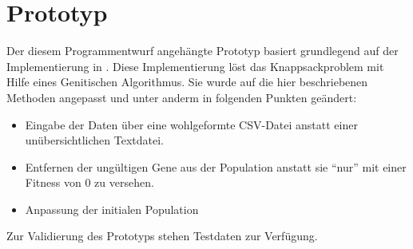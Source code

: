 \section{Prototyp}\label{sec:prototyp}

Der diesem Programmentwurf angehängte Prototyp basiert grundlegend auf der Implementierung in \cite{Quiz15Th91:online}.
Diese Implementierung löst das Knappsackproblem mit Hilfe eines Genitischen Algorithmus.
Sie wurde auf die hier beschriebenen Methoden angepasst und unter anderm
in folgenden Punkten geändert:
\begin{itemize}
    \item Eingabe der Daten über eine wohlgeformte CSV-Datei anstatt einer unübersichtlichen Textdatei.
    \item Entfernen der ungültigen Gene aus der Population anstatt sie \enquote{nur} mit einer Fitness von $0$ zu versehen.
    \item Anpassung der initialen Population
\end{itemize}

Zur Validierung des Prototyps stehen Testdaten zur Verfügung.
